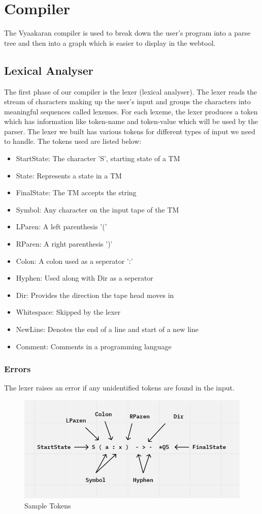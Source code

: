 \documentclass[12pt]{report}
\begin{document}
\section{Compiler}
The Vyaakaran compiler is used to break down the user's program into a parse tree and then into a graph which is easier to display in the webtool.

\subsection{Lexical Analyser}
The first phase of our compiler is the lexer (lexical analyser). The lexer reads the stream of characters making up the user's input and groups the characters into meaningful sequences called lexemes. For each lexeme, the lexer produces a token which has information like token-name and token-value which will be used by the parser. The lexer we built has various tokens for different types of input we need to handle. The tokens used are listed below:
\begin{itemize}
    \item StartState:   The character 'S', starting state of a TM
    \item State:        Represents a state in a TM
    \item FinalState:   The TM accepts the string
    \item Symbol:       Any character on the input tape of the TM
    \item LParen:       A left parenthesis '('
    \item RParen:       A right parenthesis ')'
    \item Colon:        A colon used as a seperator ':'
    \item Hyphen:       Used along with Dir as a seperator
    \item Dir:          Provides the direction the tape head moves in
    \item Whitespace:   Skipped by the lexer
    \item NewLine:      Denotes the end of a line and start of a new line
    \item Comment: Comments in a programming language
\end{itemize}
\subsubsection{Errors}
The lexer raises an error if any unidentified tokens are found in the input.
\begin{figure}[H]
  \includegraphics[width=\columnwidth]{lexerSample.png}
  \caption{Sample Tokens}
\end{figure}
\end{document}
